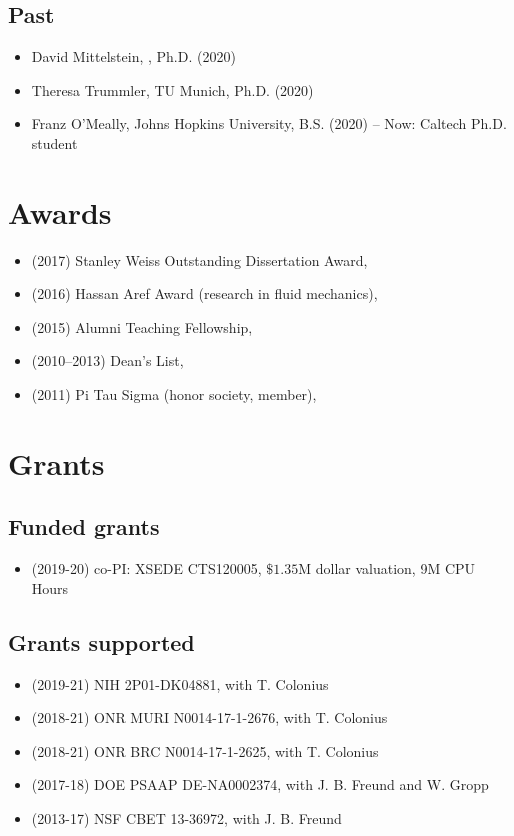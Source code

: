 \subsection{Past}

\begin{itemize}
    \item David Mittelstein, \CIT, Ph.D. (2020)
    \item Theresa Trummler, TU Munich, Ph.D. (2020)
    \item Franz O'Meally, Johns Hopkins University, B.S. (2020) -- Now: Caltech Ph.D. student
\end{itemize}

\section{Awards}

\begin{itemize}
    \item (2017) Stanley Weiss Outstanding Dissertation Award, \UIUC
    \item (2016) Hassan Aref Award (research in fluid mechanics), \UIUC
    \item (2015) Alumni Teaching Fellowship, \UIUC
    \item (2010--2013) Dean's List, \UMD
    \item (2011) Pi Tau Sigma (honor society, member), \UMD
\end{itemize}

\section{Grants}

\subsection{Funded grants}

\begin{itemize}
    \item (2019-20) co-PI: XSEDE CTS120005, $\$1.35$M dollar valuation, 9M CPU Hours
\end{itemize}

\subsection{Grants supported}

\begin{itemize}
    \item (2019-21) NIH 2P01-DK04881, with T. Colonius
    \item (2018-21) ONR MURI N0014-17-1-2676, with T. Colonius
    \item (2018-21) ONR BRC N0014-17-1-2625, with T. Colonius
    \item (2017-18) DOE PSAAP DE-NA0002374, with J. B. Freund and W. Gropp
    \item (2013-17) NSF CBET 13-36972, with J. B. Freund
\end{itemize}

